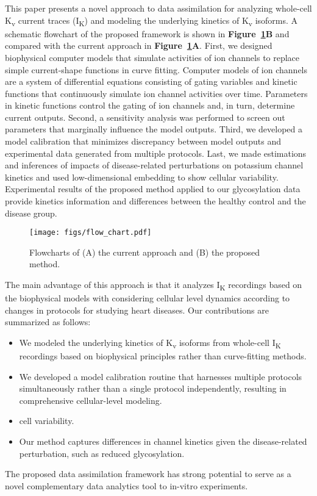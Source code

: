 \documentclass[11pt]{article}
\begin{document}
This paper presents a novel approach to data assimilation for analyzing whole-cell K\textsubscript{v} current traces (I\textsubscript{K}) and modeling the underlying kinetics of K\textsubscript{v} isoforms. A schematic flowchart of the proposed framework is shown in \textbf{Figure~\ref{fig:flow_chart}B} and compared with the current approach in \textbf{Figure~\ref{fig:flow_chart}A}. First, we designed biophysical computer models that simulate activities of ion channels to replace simple current-shape functions in curve fitting. Computer models of ion channels are a system of differential equations consisting of gating variables and kinetic functions that continuously simulate ion channel activities over time. Parameters in kinetic functions control the gating of ion channels and, in turn, determine current outputs. Second, a sensitivity analysis was performed to screen out parameters that marginally influence the model outputs. Third, we developed a model calibration that minimizes discrepancy between model outputs and experimental data generated from multiple protocols. Last, we made estimations and inferences of impacts of disease-related perturbations on potassium channel kinetics and used low-dimensional embedding to show cellular variability. Experimental results of the proposed method applied to our glycosylation data provide kinetics information and differences between the healthy control and the disease group.
\begin{figure}
    \centering
    \texttt{[image: figs/flow\_chart.pdf]}
    \caption{Flowcharts of (A) the current approach and (B) the proposed method.}
    \label{fig:flow_chart}
\end{figure}

The main advantage of this approach is that it analyzes I\textsubscript{K} recordings based on the biophysical models with considering cellular level dynamics according to changes in protocols for studying heart diseases. Our contributions are summarized as follows:
\begin{itemize}
    \item We modeled the underlying kinetics of K\textsubscript{v} isoforms from whole-cell I\textsubscript{K} recordings based on biophysical principles rather than curve-fitting methods.
    \item We developed a model calibration routine that harnesses multiple protocols simultaneously rather than a single protocol independently, resulting in comprehensive cellular-level modeling.
    \item cell variability.
    \item Our method captures differences in channel kinetics given the disease-related perturbation, such as reduced glycosylation.
\end{itemize}
The proposed data assimilation framework has strong potential to serve as a novel complementary data analytics tool to in-vitro experiments. 
\end{document}
